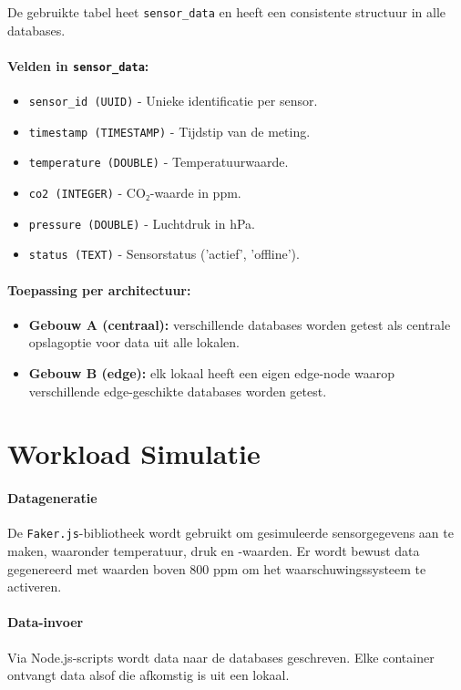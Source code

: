 De gebruikte tabel heet \texttt{sensor\_data} en heeft een consistente structuur in alle databases.

\paragraph{Velden in \texttt{sensor\_data}:}
\begin{itemize}
    \item \texttt{sensor\_id (UUID)} - Unieke identificatie per sensor.
    \item \texttt{timestamp (TIMESTAMP)} - Tijdstip van de meting.
    \item \texttt{temperature (DOUBLE)} - Temperatuurwaarde.
    \item \texttt{co2 (INTEGER)} - CO₂-waarde in ppm.
    \item \texttt{pressure (DOUBLE)} - Luchtdruk in hPa.
    \item \texttt{status (TEXT)} - Sensorstatus ('actief', 'offline').
\end{itemize}

\paragraph{Toepassing per architectuur:}
\begin{itemize}
    \item \textbf{Gebouw A (centraal):} verschillende databases worden getest als centrale opslagoptie voor data uit alle lokalen.

    \item \textbf{Gebouw B (edge):} elk lokaal heeft een eigen edge-node waarop verschillende edge-geschikte databases worden getest.
\end{itemize}

\section{Workload Simulatie}

\paragraph{Datageneratie}
De \texttt{Faker.js}-bibliotheek wordt gebruikt om gesimuleerde sensorgegevens aan te maken, waaronder temperatuur, druk en -waarden. Er wordt bewust data gegenereerd met waarden boven 800 ppm om het waarschuwingssysteem te activeren.

\paragraph{Data-invoer}
Via Node.js-scripts wordt data naar de databases geschreven. Elke container ontvangt data alsof die afkomstig is uit een lokaal.

